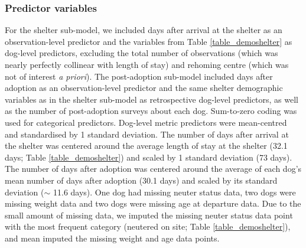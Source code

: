 \documentclass[12pt]{article}
\begin{document}
\subsubsection{Predictor variables}
For the shelter sub-model, we included days after arrival at the shelter as an observation-level predictor and the variables from Table \ref{table_demoshelter} as dog-level predictors, excluding the total number of observations (which was nearly perfectly collinear with length of stay) and rehoming centre (which was not of interest \textit{a priori}). The post-adoption sub-model included days after adoption as an observation-level predictor and the same shelter demographic variables as in the shelter sub-model as retrospective dog-level predictors, as well as the number of post-adoption surveys about each dog. Sum-to-zero coding was used for categorical predictors. Dog-level metric predictors were mean-centred and standardised by 1 standard deviation. The number of days after arrival at the shelter was centered around the average length of stay at the shelter (32.1 days; Table \ref{table_demoshelter}) and scaled by 1 standard deviation (73 days). The number of days after adoption was centered around the average of each dog's mean number of days after adoption (30.1 days) and scaled by its standard deviation ($\sim$ 11.6 days). One dog had missing neuter status data, two dogs were missing weight data and two dogs were missing age at departure data. Due to the small amount of missing data, we imputed the missing neuter status data point with the most frequent category (neutered on site; Table \ref{table_demoshelter}), and mean imputed the missing weight and age data points.
\end{document}

